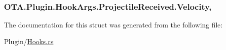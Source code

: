 \subsubsection[{Velocity}]{ O\+T\+A.\+Plugin.\+Hook\+Args.\+Projectile\+Received.\+Velocity\hspace{0.3cm}{\ttfamily [get]}, {\ttfamily [set]}}\label{struct_o_t_a_1_1_plugin_1_1_hook_args_1_1_projectile_received_a64f5549e2da87945f46a2030e81f0fa8}


The documentation for this struct was generated from the following file\+:\begin{DoxyCompactItemize}
\item 
Plugin/\hyperlink{_hooks_8cs}{Hooks.\+cs}\end{DoxyCompactItemize}
